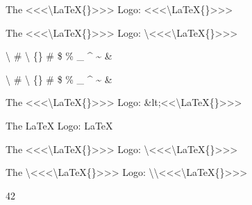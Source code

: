 
The <<<\textbackslash{}LaTeX\{\}>>> Logo: {\mktsStyleCode{}<<<\textbackslash{}LaTeX\{\}>>>}\mktsShowpar\par
The <<<\textbackslash{}LaTeX\{\}>>> Logo: {\mktsStyleCode{}\textbackslash{}<<<\textbackslash{}LaTeX\{\}>>>}\mktsShowpar\par
\textbackslash{} \# \textbackslash{} \{\} \# \$ \% \_ \textasciicircum{} \textasciitilde{} \&\mktsShowpar\par
{\mktsStyleCode{}\textbackslash{} \# \textbackslash{} \{\} \# \$ \% \_ \textasciicircum{} \textasciitilde{} \&}\mktsShowpar\par
The <<<\textbackslash{}LaTeX\{\}>>> Logo: {\mktsStyleCode{}\&lt;<<\textbackslash{}LaTeX\{\}>>>}\mktsShowpar\par
The \LaTeX{} Logo: {\mktsStyleCode{}\LaTeX{}}\mktsShowpar\par
The <<<\textbackslash{}LaTeX\{\}>>> Logo: {\mktsStyleCode{}\textbackslash{}<<<\textbackslash{}LaTeX\{\}>>>}\mktsShowpar\par
The \textbackslash{}<<<\textbackslash{}LaTeX\{\}>>> Logo: {\mktsStyleCode{}\textbackslash{}\textbackslash{}<<<\textbackslash{}LaTeX\{\}>>>}\mktsShowpar\par
42\mktsShowpar\par

